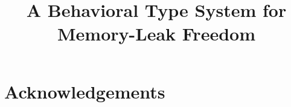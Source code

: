 \documentclass[pageno]{jpaper}
\theoremstyle{definition}
\begin{document}
\title{
A Behavioral Type System for Memory-Leak Freedom}

\date{}
\maketitle

\thispagestyle{empty}










\section{Acknowledgements}



\end{document}
